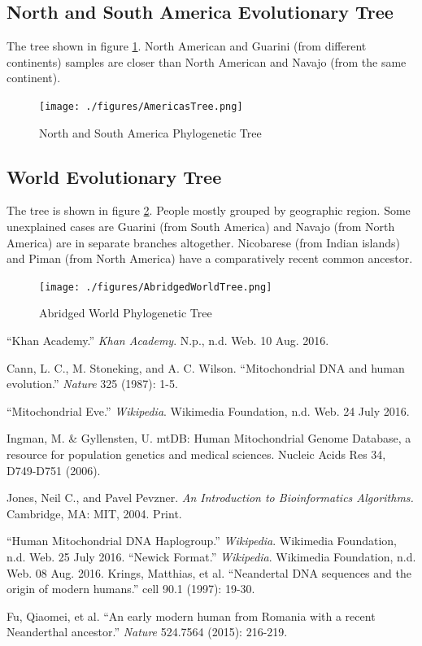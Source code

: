 \documentclass[conference]{IEEEtran}
\begin{document}
\FloatBarrier
\subsection{North and South America Evolutionary Tree}

The tree shown in figure \ref{AmericasTree}. North American and Guarini (from different continents) samples are closer than North American and Navajo (from the same continent).

\begin{figure}[!t]
\centering
\texttt{[image: ./figures/AmericasTree.png]}
\caption{North and South America Phylogenetic Tree}
\label{AmericasTree}
\end{figure}

\FloatBarrier
\subsection{World Evolutionary Tree}

The tree is shown in figure \ref{AbridgedWorldTree}. People mostly grouped by geographic region. Some unexplained cases are Guarini (from South America) and Navajo (from North America) are in separate branches altogether. Nicobarese (from Indian islands) and Piman (from North America) have a comparatively recent common ancestor. 

\begin{figure}[!t]
\centering
\texttt{[image: ./figures/AbridgedWorldTree.png]}
\caption{Abridged World Phylogenetic Tree}
\label{AbridgedWorldTree}
\end{figure}

\FloatBarrier
\begin{thebibliography}{1}

\enquote{Khan Academy.} \textit{Khan Academy}. N.p., n.d. Web. 10 Aug. 2016.

Cann, L. C., M. Stoneking, and A. C. Wilson. \enquote{Mitochondrial DNA and human evolution.} \textit{Nature} 325 (1987): 1-5.

\enquote{Mitochondrial Eve.} \textit{Wikipedia}. Wikimedia Foundation, n.d. Web. 24 July 2016.

Ingman, M. \& Gyllensten, U. mtDB: Human Mitochondrial Genome Database, a resource for population genetics and medical sciences. Nucleic Acids Res 34, D749-D751 (2006).

Jones, Neil C., and Pavel Pevzner. \textit{An Introduction to Bioinformatics Algorithms.} Cambridge, MA: MIT, 2004. Print.

\enquote{Human Mitochondrial DNA Haplogroup.} \textit{Wikipedia}. Wikimedia Foundation, n.d. Web. 25 July 2016.
\enquote{Newick Format.} \textit{Wikipedia}. Wikimedia Foundation, n.d. Web. 08 Aug. 2016.
Krings, Matthias, et al. \enquote{Neandertal DNA sequences and the origin of modern humans.} cell 90.1 (1997): 19-30.

Fu, Qiaomei, et al. \enquote{An early modern human from Romania with a recent Neanderthal ancestor.} \textit{Nature} 524.7564 (2015): 216-219.
\end{thebibliography}
\end{document}
